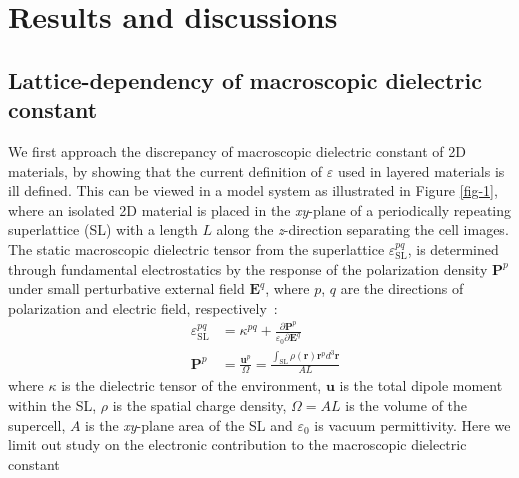 \documentclass[journal=ancac3,manuscript=article,email=true,hyperref=true,keywords=false]{achemso}
\begin{document}

\section{Results and discussions}
\label{sec:results-discussions}

\subsection{Lattice-dependency of macroscopic dielectric constant}
\label{sec:latt-depend-macr}

We first approach the discrepancy of macroscopic dielectric constant
of 2D materials, by showing that the current definition of
$\varepsilon$ used in layered materials is ill defined.  This can be
viewed in a model system as illustrated
in Figure \ref{fig-1}, where an isolated 2D material is placed in
the \textit{xy}-plane of a periodically repeating superlattice (SL)
with a length $L$ along the \textit{z}-direction separating the cell
images. The static macroscopic dielectric tensor from the superlattice
$\varepsilon_{\mathrm{SL}}^{pq}$, is determined through fundamental
electrostatics by the response of the polarization density
$\boldsymbol{P}^{p}$ under small perturbative external field
$\boldsymbol{E}^{q}$, where $p$, $q$ are the directions of
polarization and electric field,
respectively~\cite{Dressel_2001_electrodynamics}:
\begin{subequations}
  \begin{eqnarray}
      \label{eq:def-eps-1}
    &\varepsilon_{\mathrm{SL}}^{pq} &= \kappa^{pq} +
                                 {\displaystyle \frac{\partial \boldsymbol{P}^{p}}
                                 {\varepsilon_{0} \partial \boldsymbol{E}^{q}}} \\
          \label{eq:def-eps-2}
    &\boldsymbol{P}^{p} &=  {\displaystyle \frac{\boldsymbol{u}^{p}}{\Omega}}
                          = {\displaystyle \frac{{\displaystyle
          \int_{\mathrm{SL}} \rho(\boldsymbol{r}) \boldsymbol{r}^{p} d^{3}\boldsymbol{r}}}
                          {AL}}
  \end{eqnarray}
\end{subequations}
where $\kappa$ is the dielectric tensor of the environment,
$\boldsymbol{u}$ is the total dipole moment within the SL, $\rho$ is
the spatial charge density, $\Omega=AL$ is the volume of the
supercell, $A$ is the \textit{xy}-plane area of the SL and
$\varepsilon_{0}$ is vacuum permittivity. Here we limit out study on
the electronic contribution to the macroscopic dielectric constant
\end{document}
